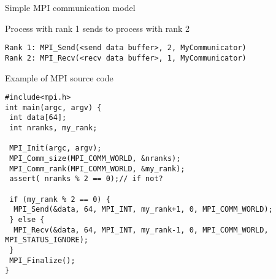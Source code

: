 \documentclass[aspectratio=43]{beamer}
\begin{document}
\begin{frame}[fragile]{Simple MPI communication model}

Process with rank 1 sends to process with rank 2
\begin{verbatim}
Rank 1: MPI_Send(<send data buffer>, 2, MyCommunicator)
Rank 2: MPI_Recv(<recv data buffer>, 1, MyCommunicator)
\end{verbatim}



\end{frame}

\begin{frame}[fragile]{Example of MPI source code}
\scriptsize
\begin{verbatim}
#include<mpi.h>
int main(argc, argv) {
 int data[64];
 int nranks, my_rank;

 MPI_Init(argc, argv);
 MPI_Comm_size(MPI_COMM_WORLD, &nranks);
 MPI_Comm_rank(MPI_COMM_WORLD, &my_rank);
 assert( nranks % 2 == 0);// if not?

 if (my_rank % 2 == 0) {
  MPI_Send(&data, 64, MPI_INT, my_rank+1, 0, MPI_COMM_WORLD);
 } else {
  MPI_Recv(&data, 64, MPI_INT, my_rank-1, 0, MPI_COMM_WORLD, MPI_STATUS_IGNORE);
 }
 MPI_Finalize();
}
\end{verbatim}
\end{frame}
\end{document}
